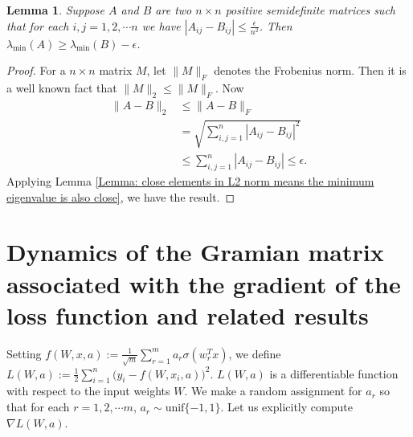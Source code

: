 \documentclass[a4paper,11pt]{amsart}
\theoremstyle{definition}
\theoremstyle{plain}
\newtheorem{lmma}[dfn]{Lemma}
\theoremstyle{remark}
\begin{document}
\begin{lmma}\label{Lemma: close elements in Frobenius normx means the minimum eigenvalue is also close}
Suppose $A$ and $B$ are two $n\times n$ positive semidefinite matrices such that for each $i,j=1,2,\cdots n$ we have $|A_{ij}-B_{ij}|\leq\frac{\epsilon}{n^2}$. Then $\lambda_{\min}(A)\geq\lambda_{\min}(B)-\epsilon$.
\end{lmma}

\begin{proof}
For a $n\times n$ matrix $M$, let $\|M\|_F$ denotes the Frobenius norm. Then it is a well known fact that $\|M\|_2\leq\|M\|_F$. Now
\begin{equation*}
\begin{split}
\|A-B\|_2&\leq\|A-B\|_F\\
&=\sqrt{\sum_{i,j=1}^n|A_{ij}-B_{ij}|^2}\\
&\leq\sum_{i,j=1}^n|A_{ij}-B_{ij}|\leq\epsilon.
\end{split}
\end{equation*}
Applying Lemma \ref{Lemma: close elements in L2 norm means the minimum eigenvalue is also close}, we have the result.
\end{proof}

\section{Dynamics of the Gramian matrix associated with the gradient of the loss function and related results}\label{Subsection: dynamics of the Gramian matrix associated with the gradient of the loss function} 
Setting $f(W,x,a):=\frac{1}{\sqrt{m}}\sum_{r=1}^m a_r\sigma(w_r^Tx)$, we define\\ $L(W,a):=\frac{1}{2}\sum_{i=1}^n\Big(y_i-f(W,x_i,a)\Big)^2$. $L(W,a)$ is a differentiable function with respect to the input weights $W$. We make a random assignment for $a_r$ so that for each $r=1,2,\cdots m$, $a_r\sim\text{unif}\{-1,1\}$. Let us explicitly compute $\nabla L(W,a)$. 
\end{document}
